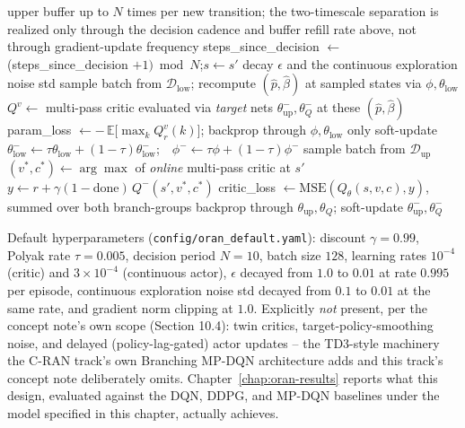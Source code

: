 \begin{algorithm}[htbp]
\begin{algorithmic}[1]
{      upper buffer up to $N$ times per new transition; the two-timescale
      separation is realized only through the decision cadence and buffer
      refill rate above, not through gradient-update frequency}
    \State steps\_since\_decision $\gets$ (steps\_since\_decision $+1) \bmod N$;\quad $s \gets s'$
  \EndFor
  \State decay $\epsilon$ and the continuous exploration noise std
\EndFor
\Statex
{}
  \State sample batch from $\mathcal{D}_{\mathrm{low}}$; recompute $(\hat p, \hat\beta)$ at sampled states via $\phi, \theta_{\mathrm{low}}$
  \State $Q^v \gets$ multi-pass critic evaluated via \emph{target} nets $\theta_{\mathrm{up}}^{-}, \theta_Q^{-}$ at these $(\hat p, \hat\beta)$
  \State param\_loss $\gets -\,\mathbb{E}\big[\max_k Q^v_r(k)\big]$; backprop through $\phi, \theta_{\mathrm{low}}$ only
  \State soft-update $\theta_{\mathrm{low}}^{-} \gets \tau\theta_{\mathrm{low}} + (1-\tau)\theta_{\mathrm{low}}^{-}$;\ \ $\phi^{-} \gets \tau\phi + (1-\tau)\phi^{-}$
\EndFunction
\Statex
{}
  \State sample batch from $\mathcal{D}_{\mathrm{up}}$
  \State $(v^*, c^*) \gets \arg\max$ of \emph{online} multi-pass critic at $s'$ 
  \State $y \gets r + \gamma(1-\mathrm{done})\, Q^{-}(s', v^*, c^*)$ 
  \State critic\_loss $\gets \mathrm{MSE}(Q_\theta(s, v, c), y)$, summed over both branch-groups
  \State backprop through $\theta_{\mathrm{up}}, \theta_Q$; soft-update $\theta_{\mathrm{up}}^{-}, \theta_Q^{-}$
\EndFunction
\end{algorithmic}
\end{algorithm}

Default hyperparameters (\texttt{config/oran\_default.yaml}): discount
$\gamma=0.99$, Polyak rate $\tau=0.005$, decision period $N=10$, batch size
$128$, learning rates $10^{-4}$ (critic) and $3\times10^{-4}$ (continuous
actor), $\epsilon$ decayed from $1.0$ to $0.01$ at rate $0.995$ per
episode, continuous exploration noise std decayed from $0.1$ to $0.01$ at
the same rate, and gradient norm clipping at $1.0$. Explicitly \emph{not}
present, per the concept note's own scope (Section 10.4): twin critics,
target-policy-smoothing noise, and delayed (policy-lag-gated) actor
updates -- the TD3-style machinery the C-RAN track's own Branching MP-DQN
architecture adds and this track's concept note deliberately omits.
Chapter~\ref{chap:oran-results} reports what this design, evaluated
against the DQN, DDPG, and MP-DQN baselines under the model specified in
this chapter, actually achieves.

